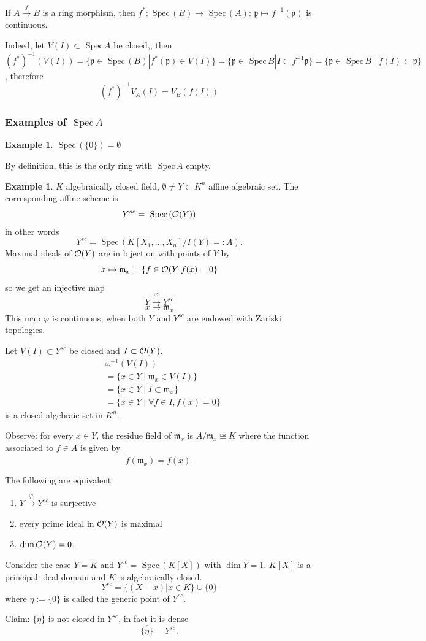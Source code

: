 \documentclass[11pt]{article}
\theoremstyle{definition}
\newtheorem{ex}[thm]{Example}
\newcommand{\spec}{\text{ Spec}\,}
\newcommand{\scm}{{\mathfrak m}}
\newcommand{\scp}{{\mathfrak p}}
\newcommand{\calo}{{\cal O}}
\newcommand{\lrta}{\longrightarrow}
\begin{document}
If $A\overset{f}{\lrta} B$ is a ring morphism, then $f^*:\spec(B)\lrta \spec (A)$: $\scp\mapsto f^{-1}(\scp)$ is continuous.

Indeed, let $V(I)\subset \spec A$ be closed,, then $(f^{*})^{-1}(V(I))=\{\scp\in\spec (B)|f^*(\scp)\in V(I)\}=\{\scp\in\spec B|I\subset f^{-1}\scp\}=\{\scp \in \spec B\mid f(I)\subset \scp\}$, therefore
$$
(f^{*})^{-1}V_A(I)=V_B(f(I))
$$

\subsubsection{Examples of $\spec A$}
\begin{ex}
$\spec (\{0\})=\emptyset$

By definition, this is the only ring with $\spec A$ empty.
\end{ex}

\begin{ex}\label{ex:K-algebra}
$K$ algebraically closed field, $\emptyset\neq Y\subset K^n$ affine algebraic set. The corresponding  affine scheme is 
$$
Y^{sc}
=\spec (\calo(Y))$$
in other words
$$
Y^{sc}=\spec (K[X_1,...,X_n]/I(Y)=:A).
$$
Maximal ideals of $\calo(Y)$ are in bijection with points of $Y$ by 
$$
x\mapsto \scm_x=\{f\in\calo(Y|f(x)=0\}
$$
so we get an injective map
$$
Y\overset{\varphi}{\lrta} Y^{sc}
$$
$$
x\longmapsto \scm_x
$$
This map $\varphi$ is continuous, when both $Y$ and $Y^{sc}$ are endowed with Zariski topologies.

Let $V(I)\subset Y^{sc}$ be closed and $I\subset \calo(Y)$.
$$
\begin{aligned}
&\varphi^{-1}(V(I))\\
&=\{x\in Y\mid \scm_x\in V(I)\}\\
&=\{x\in Y\mid I\subset\scm_x\}\\
&=\{x\in Y\mid \forall f\in I, f(x)=0\}
\end{aligned}
$$
is a closed algebraic set in $K^n$.

Observe: for every $x\in Y$, the residue field of $\scm_x$ is $A/\scm_x \cong K$ where the function associated to $f\in A$ is given by 
$$
\tilde{f}(\scm_x)=f(x).
$$

The following are equivalent
\begin{enumerate}
\item $Y\overset{\varphi}{\lrta} Y^{sc}$ is surjective
\item every prime ideal in $\calo(Y)$ is maximal
\item $\dim \calo(Y) = 0$.
\end{enumerate}
Consider the case $Y=K$ and $Y^{sc}=\spec (K[X])$ with $\dim Y=1$.
$K[X]$ is a principal ideal domain and $K$ is algebraically closed.
$$
Y^{sc}=\{(X-x)|x\in K\}\cup \{0\}
$$
where $\eta:=\{0\}$ is called the generic point of $Y^{sc}$.

\underline{Claim}: $\{\eta\}$ is not closed in $Y^{sc}$, in fact it is dense
$$
\overline{\{\eta\}}=Y^{sc}.
$$
\end{ex}
\end{document}
